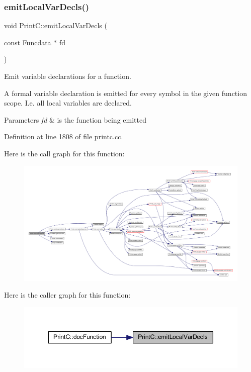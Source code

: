 \subsubsection{\texorpdfstring{emitLocalVarDecls()}{emitLocalVarDecls()}}
{\footnotesize\ttfamily void Print\+C\+::emit\+Local\+Var\+Decls (\begin{DoxyParamCaption}\item[{const \mbox{\hyperlink{class_funcdata}{Funcdata}} $\ast$}]{fd }\end{DoxyParamCaption})\hspace{0.3cm}{\ttfamily [protected]}}



Emit variable declarations for a function. 

A formal variable declaration is emitted for every symbol in the given function scope. I.\+e. all local variables are declared. 
\begin{DoxyParams}{Parameters}
{\em fd} & is the function being emitted \\
\hline
\end{DoxyParams}


Definition at line 1808 of file printc.\+cc.

Here is the call graph for this function\+:
\nopagebreak
\begin{figure}[H]
\begin{center}
\leavevmode
\includegraphics[width=350pt]{class_print_c_a344e10d6f5f8b2b2fda6dc627e1b3c94_cgraph}
\end{center}
\end{figure}
Here is the caller graph for this function\+:
\nopagebreak
\begin{figure}[H]
\begin{center}
\leavevmode
\includegraphics[width=350pt]{class_print_c_a344e10d6f5f8b2b2fda6dc627e1b3c94_icgraph}
\end{center}
\end{figure}
\mbox{\label{class_print_c_a316a42f523295a421f9d40f0b3fcf92e}} 

